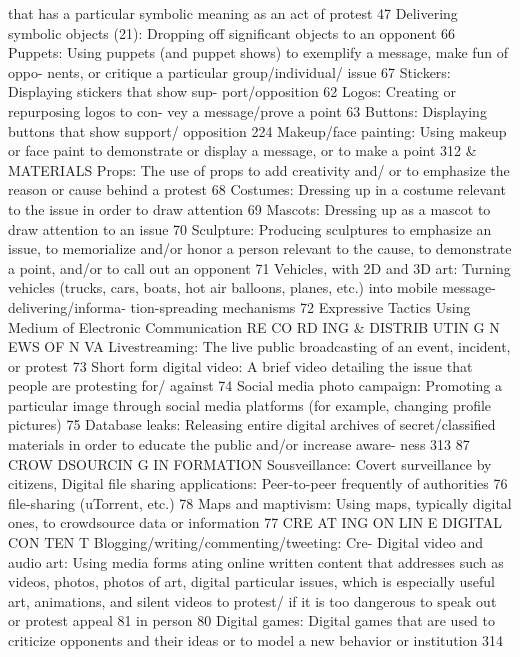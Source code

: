 \documentclass[twoside,a4paper,12pt,fleqn,openany]{extbook}
\begin{document}
that has a particular symbolic meaning as an
act of protest
 47
Delivering symbolic objects (21): Dropping off
significant objects to an opponent
 66
Puppets: Using puppets (and puppet shows)
to exemplify a message, make fun of oppo-
nents, or critique a particular group/individual/
issue
 67
Stickers: Displaying stickers that show sup-
port/opposition
 62
Logos: Creating or repurposing logos to con-
vey a message/prove a point
 63
Buttons: Displaying buttons that show support/
opposition
 224
Makeup/face painting: Using makeup or face
paint to demonstrate or display a message, or
to make a point
 312
& MATERIALS
Props: The use of props to add creativity and/
or to emphasize the reason or cause behind a
protest
 68
Costumes: Dressing up in a costume relevant
to the issue in order to draw attention
 69
Mascots: Dressing up as a mascot to draw
attention to an issue
 70
Sculpture: Producing sculptures to emphasize
an issue, to memorialize and/or honor a person
relevant to the cause, to demonstrate a point,
and/or to call out an opponent
 71
Vehicles, with 2D and 3D art: Turning vehicles
(trucks, cars, boats, hot air balloons, planes,
etc.) into mobile message-delivering/informa-
tion-spreading mechanisms
 72
Expressive Tactics Using Medium of Electronic Communication
RE CO RD ING & DISTRIB UTIN G N EWS OF N VA
Livestreaming: The live public broadcasting of
an event, incident, or protest
 73
Short form digital video: A brief video detailing
the issue that people are protesting for/
against
 74
Social media photo campaign: Promoting a
particular image through social media platforms
(for example, changing profile pictures)
 75
Database leaks: Releasing entire digital
archives of secret/classified materials in order
to educate the public and/or increase aware-
ness
 313
87
CROW DSOURCIN G IN FORMATION
Sousveillance: Covert surveillance by citizens,
 Digital file sharing applications: Peer-to-peer
frequently of authorities
 76
 file-sharing (uTorrent, etc.)
 78
Maps and maptivism: Using maps, typically digital
ones, to crowdsource data or information
 77
CRE AT ING ON LIN E DIGITAL CON TEN T
Blogging/writing/commenting/tweeting: Cre-
 Digital video and audio art: Using media forms
ating online written content that addresses
 such as videos, photos, photos of art, digital
particular issues, which is especially useful
 art, animations, and silent videos to protest/
if it is too dangerous to speak out or protest
 appeal
 81
in person
 80
Digital games: Digital games that are used to
criticize opponents and their ideas or to model
a new behavior or institution
 314
\end{document}
